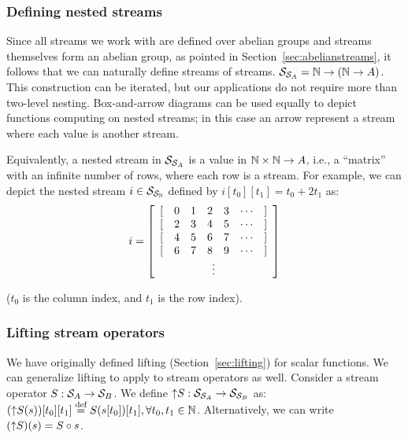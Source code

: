 \subsubsection{Defining nested streams}

Since all streams we work with are defined over abelian groups
and streams themselves form an abelian group, as pointed in Section~\ref{sec:abelianstreams},
it follows that we can naturally define streams of streams.
$\mathcal{S}_{\mathcal{S}_{A}} = \mathbb{N} \rightarrow (\mathbb{N} \rightarrow A)$.  This construction
can be iterated, but our applications do not require more than 
two-level nesting.  Box-and-arrow diagrams can be used equally to
depict functions computing on nested streams; in this case an
arrow represent a stream where each value is another stream.

\newcommand{\ssa}[1]{
\setsepchar{ }
\readlist\arg{#1}
\begin{bmatrix}
   \begin{array}{ccccccc}
        {[} & \arg[1] & \arg[2] & \arg[3] & \arg[4] & \cdots & {]} \\
        {[} & \arg[5] & \arg[6] & \arg[7] & \arg[8] & \cdots & {]} \\
        {[} & \arg[9] & \arg[10] & \arg[11] & \arg[12] & \cdots & {]} \\
        {[} & \arg[13] & \arg[14] & \arg[15] & \arg[16] & \cdots & {]} \\
        \multicolumn{7}{c}{\vdots}
   \end{array}
\end{bmatrix}
}

Equivalently, a nested stream in $\mathcal{S}_{\mathcal{S}_{A}}$ is a value in
$\mathbb{N} \times \mathbb{N} \to A$, i.e., a ``matrix''
with an infinite number of rows, where each row is a stream.  
For example, we can depict the nested stream 
$i \in \mathcal{S}_{\mathcal{S}_{\mathbb{N}}}$ defined by $i[t_0][t_1] = t_0 + 2 t_1$ as:
$$ i = \ssa{0 1 2 3 2 3 4 5 4 5 6 7 6 7 8 9} $$

\noindent ($t_0$ is the column index, and $t_1$ is the row index).

\subsubsection{Lifting stream operators}

We have originally defined lifting (Section~\ref{sec:lifting}) for scalar functions.
We can generalize lifting to apply to stream operators as well.  Consider a 
stream operator $S: \mathcal{S}_{A} \to \mathcal{S}_{B}$.  We define ${\uparrow}S: \mathcal{S}_{\mathcal{S}_{A}} 
\to \mathcal{S}_{\mathcal{S}_{B}}$ as: $({\uparrow}S(s))[t_0][t_1] \stackrel{\textrm{\scriptsize def}}{=} S(s[t_0])[t_1], \forall t_0, t_1 \in
\mathbb{N}$.  Alternatively, we can write $({\uparrow}S)(s) = S \circ s$.

